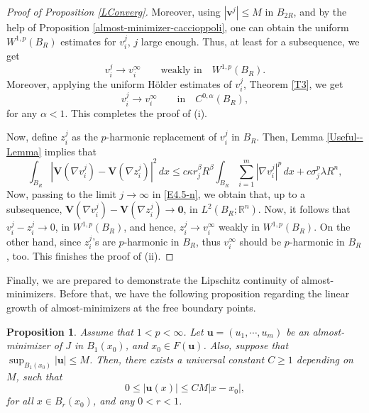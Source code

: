 \documentclass{amsart}
\newtheorem{proposition}[theorem]{Proposition}
\begin{document}
\begin{proof}[Proof of Proposition \ref{LConverg}]
Moreover, using $\left|\mathbf{v}^j \right|\leq M$ in $B_{2R}$, and 
by the help of Proposition \ref{almost-minimizer-caccioppoli}, one can obtain the uniform $W^{1,p}(B_R)$ estimates for $v_i^j$, $j$ large enough. Thus, at least for a subsequence, we get
$$ v_i^j \to v_i^{\infty} \qquad \text{weakly in} \quad W^{1,p}(B_R). $$
Moreover, applying the uniform H\"older estimates of $v_i^j$, Theorem \ref{T3}, we get
$$ v_i^j \to v_i^{\infty} \qquad \text{in} \quad C^{0,\alpha}(B_R),$$
for any $\alpha<1$. This completes the proof of \textup{(i)}.

Now, define $z_i^j$ as the $p$-harmonic replacement of $v_i^j$ in $B_{R}$. Then, Lemma \ref{Useful--Lemma} implies that
\begin{equation}
\label{E4.5-n}
\int_{B_{R}} \left| \mathbf{V} \left(\nabla v_i^j \right) - \mathbf{V} \left(\nabla z_i^j \right) \right|^2 \, dx \leq c \kappa r_j^{\beta} R^{\beta} \int_{B_{R}} \sum_{i=1}^{m} \left|\nabla v_i^j \right|^p \, dx + c \sigma_j^p \lambda R^n,
\end{equation}
Now, passing to the limit $j \to \infty$ in \eqref{E4.5-n}, we obtain that, up to a subsequence, $\mathbf{V} \left(\nabla v_i^j \right) - \mathbf{V} \left(\nabla z_i^j \right) \to \mathbf{0}$,  in $L^{2}(B_R; \mathbb{R}^n)$. Now, it follows that $v_i^j-z_i^j \to 0$, in $W^{1,p}(B_R)$, and
hence, $z_i^j\to v_i^{\infty}$ weakly in $W^{1,p}(B_R)$. 
On the other hand, since $z_i^j$'s are $p$-harmonic in $B_R$, thus $v_i^{\infty}$ should be $p$-harmonic in $B_R$, too. This finishes the proof of \textup{(ii)}. 
\end{proof}




Finally, we are prepared to demonstrate the Lipschitz continuity of almost-minimizers. 
Before that, we have the following proposition regarding the linear growth of almost-minimizers at the free boundary points.



\begin{proposition}
\label{SSSP-01}
Assume that $1<p<\infty$. Let $\mathbf{u}=(u_1, \cdots, u_m)$ be an almost-minimizer of $J$ in $B_1(x_0)$, and $x_0 \in F(\mathbf{u})$. 
Also, suppose that $\sup_{B_1(x_0)} |\mathbf{u}| \leq M$. 
Then, there exists a universal constant $C\ge 1$ depending on $M$, such that
$$ 0 \leq |\mathbf{u}(x)| \leq CM |x-x_0|, $$
for all $x \in B_{r}(x_0)$, and any $0<r<1$.
\end{proposition}
\end{document}
